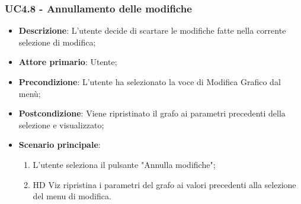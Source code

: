 \subsubsection{UC4.8 - Annullamento delle modifiche}
\label{ssub:uc4.8}
\begin{itemize}
    \item \textbf{Descrizione}: L'utente decide di scartare le modifiche fatte nella corrente selezione di modifica;

    \item \textbf{Attore primario}: Utente;

    \item \textbf{Precondizione}:   L'utente ha selezionato la voce di Modifica Grafico dal menù;
    \item \textbf{Postcondizione}:  Viene ripristinato il grafo ai parametri precedenti della selezione e visualizzato;

	\item \textbf{Scenario principale}:
        \begin{enumerate}
            \item L'utente seleziona il pulsante "Annulla modifiche";
            \item HD Viz ripristina i parametri del grafo ai valori precedenti alla selezione del menu di modifica.
        \end{enumerate}
\end{itemize}
